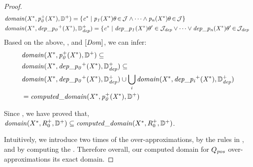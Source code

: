 \documentclass[acmsmall,screen,review,anonymous,nonacm]{acmart}
\begin{document}
\begin{lemma}
{\begin{proof}
\begin{align*}
& \mathit{domain}\mathit{(X^*, p_0^+(X^*), \mathbb{D}^+)} =
\mathit{
\{c^* \mid 
p_1(X^*)\theta{\,\in\,}\mathcal{J} \wedge \dots \wedge p_n(X^*)\theta{\,\in\,}\mathcal{J} 
\} 
}
\\
& \mathit{domain}\mathit{(X^*, dep\_{p_0}^+(X^*), \mathbb{D}^+_{dep})} =
\mathit{
\{c^* \mid 
dep\_{p_1}(X^*)\theta^\prime \in \mathcal{J}_{dep} \vee
\dots \vee 
\mathit{dep\_{p_n}(X^*)\theta^\prime{\,\in\,}\mathcal{J}_{dep} 
\
}
}
\end{align*}
Based on the above, , and $\mathit{[Dom]}$, we can infer:
\begin{align*}
& \mathit{domain}\mathit{(X^*, p_0^+(X^*), \mathbb{D}^+)} \subseteq \\
& \mathit{domain}\mathit{(X^*, dep\_{p_0}^+(X^*), \mathbb{D}^+_{dep})} \subseteq \\
& \mathit{domain}\mathit{(X^*, dep\_{p_0}^+(X^*), \mathbb{D}^+_{dep})} \cup  \bigcup_{i} \mathit{domain}\mathit{(X^*, dep\_{p_i}^+(X^*), \mathbb{D}^+_{dep})} \\
& = \mathit{computed\_domain}\mathit{(X^*, p_0^+(X^*), \mathbb{D}^+)}
\end{align*}

\noindent Since , we have proved that, 
$\mathit{domain}(X^*, R_0^+, \mathbb{D}^+) \subseteq \mathit{computed\_domain}(X^*, R_0^+, \mathbb{D}^+)$. 

Intuitively, we introduce two times of the over-approximations, \ie by the rules in , and by computing the 
\code{\mathrm{unifiable}}. Therefore overall, our computed domain for \code{X^*} \wrt $Q_{\mathit{pos}}$ over-approximations its  exact domain. 


\end{proof}}
\end{lemma}
\end{document}

